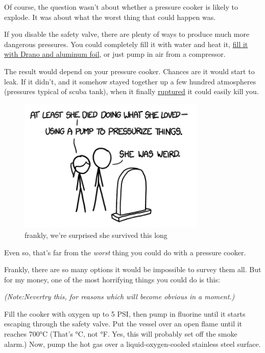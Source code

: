 {Of course, the question wasn’t about whether a pressure cooker is likely to explode. It was about what the worst thing that could happen was.}

{If you disable the safety valve, there are plenty of ways to produce much more dangerous pressures. You could completely fill it with water and heat it, \href{http://www.youtube.com/watch?v=YbaiCdX1XWc}{fill it with Drano and aluminum foil}, or just pump in air from a compressor.}

{The result would depend on your pressure cooker. Chances are it would start to leak. If it didn’t, and it somehow stayed together up a few hundred atmospheres (pressures typical of scuba tank), when it finally \href{http://www.youtube.com/watch?v=tyINNUaXa8Q}{ruptured} it could easily kill you.}

\begin{figure}[!htbp]
\centering
\includegraphics[scale=0.5, max width=0.8\textwidth]{imgs/a/40/pressure_cooker_grave.png}
\caption{frankly, we're surprised she survived this long}
\end{figure}

{Even so, that’s far from the \emph{worst} thing you could do with a pressure cooker.}

{Frankly, there are so many options it would be impossible to survey them all. But for my money, one of the most horrifying things you could do is this:}

{ \emph{(Note:Nevertry this, for reasons which will become obvious in a moment.)} }

{Fill the cooker with oxygen up to 5 PSI, then pump in fluorine until it starts escaping through the safety valve. Put the vessel over an open flame until it reaches 700°C (That’s °C, not °F. Yes, this will probably set off the smoke alarm.) Now, pump the hot gas over a liquid-oxygen-cooled stainless steel surface.}

